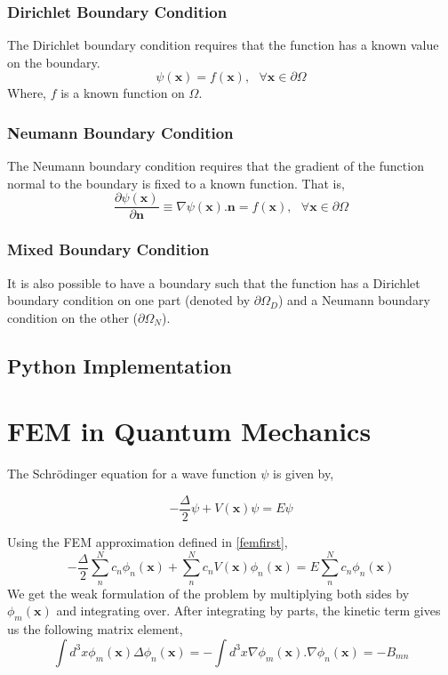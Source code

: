 \documentclass[a4paper,10pt]{report}
\begin{document}
\subsubsection{Dirichlet Boundary Condition}
The Dirichlet boundary condition requires that the function has a known value on the boundary.
\begin{equation}\label{dirichlet1}
 \psi(\mathbf{x})=f(\mathbf{x}), \mbox{ }\forall\mathbf{x}\in \partial\Omega
\end{equation}
Where, $f$ is a known function on $\Omega$.

\subsubsection{Neumann Boundary Condition}
The Neumann boundary condition requires that the gradient of the function
normal to the boundary is fixed to a known function. That is,
\begin{equation}\label{neumann1}
 \frac{\partial\psi(\mathbf{x})}{\partial\mathbf{n}}\equiv\nabla\psi(\mathbf{x}).\mathbf{n} = f(\mathbf{x}), \mbox{ }\forall\mathbf{x}\in \partial\Omega
\end{equation}

\subsubsection{Mixed Boundary Condition}
It is also possible to have a boundary such that the function has a Dirichlet boundary
condition on one part (denoted by $\partial\Omega_D$) and a Neumann boundary condition
on the other ($\partial\Omega_N$).

\subsection{Python Implementation}
\section{FEM in Quantum Mechanics}
The Schrödinger equation for a wave function $\psi$ is given by,

\begin{equation}\label{schroedinger1}
 -\frac{\Delta}{2}\psi+V(\mathbf{x})\psi=E\psi
\end{equation}

\noindent Using the FEM approximation defined in \eqref{femfirst},
\begin{equation}\label{schroedinger}
 -\frac{\Delta}{2}\displaystyle\sum_n^N c_n\phi_n(\mathbf{x})+\displaystyle\sum_n^N c_n V(\mathbf{x})\phi_n(\mathbf{x})=E\displaystyle\sum_n^N c_n\phi_n(\mathbf{x})
\end{equation}
\noindent We get the weak formulation of the problem by multiplying both sides by $\phi_m(\mathbf{x})$ and integrating over. After integrating by parts, the kinetic term gives us
the following matrix element,
\begin{equation}\label{kineticterm}
 \int d^3x\phi_m(\mathbf{x})\Delta\phi_n(\mathbf{x}) = -\int d^3x\nabla\phi_m(\mathbf{x}).\nabla\phi_n(\mathbf{x}) = -B_{mn}
\end{equation}
\end{document}
